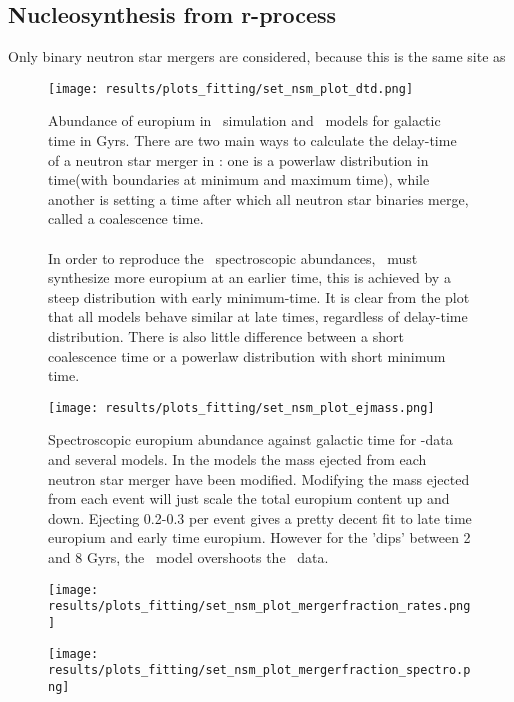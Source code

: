 \subsection{Nucleosynthesis from r-process}
Only binary neutron star mergers are considered, because this is the same site as 
\begin{figure}[h]
  \centering
  \texttt{[image: results/plots\_fitting/set\_nsm\_plot\_dtd.png]}
  \caption{\label{fig:fit-v3-dtd}
    Abundance of europium in \eris\ simulation and \omegamodel\ models for galactic time in Gyrs.
    There are two main ways to calculate the delay-time of a neutron star merger in \omegamodel: one is a powerlaw distribution in time(with boundaries at minimum and maximum time), while another is setting a time after which all neutron star binaries merge, called a coalescence time.
    \\  \\
    In order to reproduce the \eris\ spectroscopic abundances, \omegamodel\ must synthesize more europium at an earlier time, this is achieved by a steep distribution with early minimum-time. It is clear from the plot that all models behave similar at late times, regardless of delay-time distribution. There is also little difference between a short coalescence time or a powerlaw distribution with short minimum time.
  }
\end{figure}
\begin{figure}[h]
  \centering
  \texttt{[image: results/plots\_fitting/set\_nsm\_plot\_ejmass.png]}
  \caption{\label{fig:fit-v3-ejecta}
    Spectroscopic europium abundance against galactic time for \eris-data and several \omegamodel models. In the models the mass ejected from each neutron star merger have been modified.
    Modifying the mass ejected from each event will just scale the total europium content up and down.
    Ejecting 0.2-0.3 \msol per event gives a pretty decent fit to late time europium and early time europium.
    However for the 'dips' between 2 and 8 Gyrs, the \omegamodel\ model overshoots the \eris\ data.
  }
\end{figure}
\begin{figure}[h]
  \centering
  \texttt{[image: results/plots\_fitting/set\_nsm\_plot\_mergerfraction\_rates.png]}
  \caption{\label{fig:fit-v3-mergerfrac-nsmr}}
\end{figure}
\begin{figure}[h]
  \centering
  \texttt{[image: results/plots\_fitting/set\_nsm\_plot\_mergerfraction\_spectro.png]}
  \caption{\label{fig:fit-v3-mergerfrac-euro}}
\end{figure}
